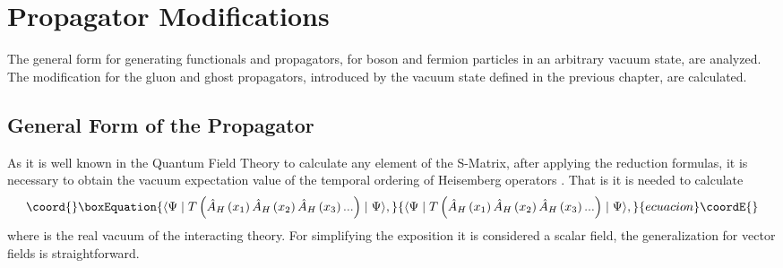 \documentclass[12pt,letterpaper]{report}
\begin{document}
\chapter{Propagator Modifications}

The general form for generating functionals and propagators, for
boson and fermion particles in an arbitrary vacuum state, are
analyzed. The modification for the gluon and ghost propagators,
introduced by the vacuum state defined in the previous chapter,
are calculated.

\section{General Form of the Propagator}

As it is well known in the Quantum Field Theory to calculate any
element of the S-Matrix, after applying the reduction formulas, it
is necessary to obtain the vacuum expectation value of the
temporal ordering of Heisemberg operators \cite{Gasiorowicz}. That
is it is needed to calculate
\begin{equation}\coord{}\boxEquation{
\langle \Psi \mid T\left(\hat{A}_H\left(x_1\right) \hat{A}_H\left(
x_2\right) \hat{A}_H\left(x_3\right)...\right) \mid \Psi \rangle,
\label{orden1}
}{
\langle \Psi \mid T\left(\hat{A}_H\left(x_1\right) \hat{A}_H\left(
x_2\right) \hat{A}_H\left(x_3\right)...\right) \mid \Psi \rangle,
}{ecuacion}\coordE{}\end{equation}
where \myHighlight{$\mid \Psi \rangle $}\coordHE{} is the real vacuum of the interacting
theory. For simplifying the exposition it is considered a scalar
field, the generalization for vector fields is straightforward.
\end{document}
